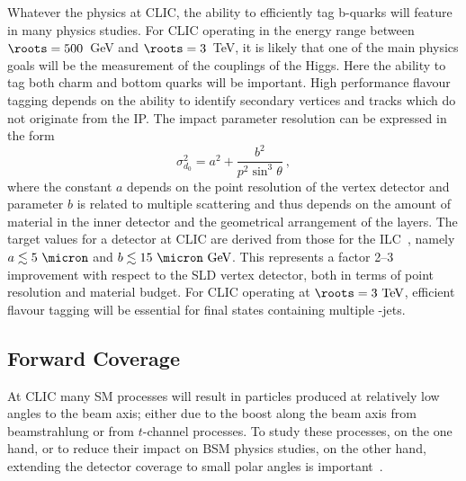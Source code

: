 Whatever the physics at CLIC, the ability to efficiently tag b-quarks will
feature in many physics studies. For CLIC operating in the energy range between $\roots=500$~GeV and $\roots=3$~TeV, it is
likely that one of the main physics goals will be the measurement of the 
couplings of the Higgs. Here the ability to tag both charm and bottom quarks
will be important. High performance flavour tagging depends on the ability to
identify secondary vertices and tracks which do not originate from the IP\@. The
impact parameter resolution can be expressed in the form
\begin{equation}\label{chap3:eq:impactpararesolution}
\sigma_{d_{0}}^2 = a^2 + \frac{b^{2}}{p^{2}\sin^{3}\theta}~,
\end{equation}
where the constant $a$ depends on the point resolution of the vertex detector and
parameter $b$ is related to multiple scattering and thus depends on the
amount of material in the inner detector and the geometrical arrangement of the
layers. The target values for a detector at
CLIC are derived from those for the \acs{ILC}~\cite{ildloi:2009}, 
namely $a  \lesssim 5~\micron$ and
$b \lesssim 15~\mathrm{\micron~GeV}$. 
This represents a factor 2--3 improvement
with respect to the \acs{SLD} vertex detector, both in terms of point resolution and
material budget. For CLIC operating at $\roots=3~\mathrm{TeV}$, efficient flavour
tagging will be essential for final states containing multiple \PQb-jets.

\subsection{Forward Coverage\label{sec:chapter3:requirements:forward}}
At CLIC many \acs{SM} processes will result in particles produced at relatively low angles to the beam axis; either
due to the boost along the beam axis from beamstrahlung or from $t$-channel processes. To study these processes, on the one hand, or to reduce their impact on \acs{BSM} physics studies, on the other hand, extending the detector coverage to small
polar angles is important~\cite{Fuster:2009em}.

